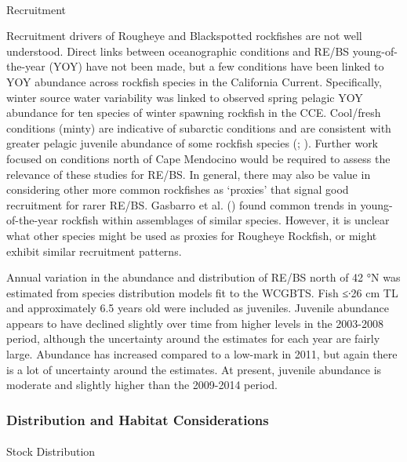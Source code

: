 \documentclass[
  english,
]{article}
\makeatletter
\let\oldparagraph\paragraph
\renewcommand{\paragraph}{
    \@ifstar
      \xxxParagraphStar
      \xxxParagraphNoStar
  }
\newcommand{\xxxParagraphStar}[1]{\oldparagraph*{#1}\mbox{}}
\newcommand{\xxxParagraphNoStar}[1]{\oldparagraph{#1}\mbox{}}
\makeatother
\begin{document}
\paragraph{Recruitment}\label{recruitment-1}

Recruitment drivers of Rougheye and Blackspotted rockfishes are not well
understood. Direct links between oceanographic conditions and RE/BS
young-of-the-year (YOY) have not been made, but a few conditions have
been linked to YOY abundance across rockfish species in the California
Current. Specifically, winter source water variability was linked to
observed spring pelagic YOY abundance for ten species of winter spawning
rockfish in the CCE. Cool/fresh conditions (minty) are indicative of
subarctic conditions and are consistent with greater pelagic juvenile
abundance of some rockfish species
(;
). Further work
focused on conditions north of Cape Mendocino would be required to
assess the relevance of these studies for RE/BS. In general, there may
also be value in considering other more common rockfishes as `proxies'
that signal good recruitment for rarer RE/BS. Gasbarro et al.
() found common trends in
young-of-the-year rockfish within assemblages of similar species.
However, it is unclear what other species might be used as proxies for
Rougheye Rockfish, or might exhibit similar recruitment patterns.

Annual variation in the abundance and distribution of RE/BS north of 42
°N was estimated from species distribution models fit to the WCGBTS.
Fish ≤∙26 cm TL and approximately 6.5 years old were included as
juveniles. Juvenile abundance appears to have declined slightly over
time from higher levels in the 2003-2008 period, although the
uncertainty around the estimates for each year are fairly large.
Abundance has increased compared to a low-mark in 2011, but again there
is a lot of uncertainty around the estimates. At present, juvenile
abundance is moderate and slightly higher than the 2009-2014 period.

\subsubsection{Distribution and Habitat
Considerations}\label{distribution-and-habitat-considerations}

\paragraph{Stock Distribution}\label{stock-distribution}
\end{document}
